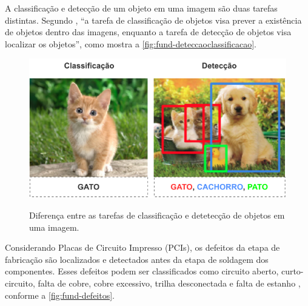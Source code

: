 A classificação e detecção de um objeto em uma imagem são duas tarefas distintas. Segundo , ``a tarefa de classificação de objetos visa prever a existência de objetos dentro das imagens, enquanto a tarefa de detecção de objetos visa localizar os objetos'', como mostra a \autoref{fig:fund-deteccaoclassificacao}.

\begin{figure}[h!] %
  \centering
  \caption{Diferença entre as tarefas de classificação e detetecção de objetos em uma imagem.}
  \includegraphics[scale=1.1]{img/img-fundamentacao-deteccaoclassificacao.pdf}
  \label{fig:fund-deteccaoclassificacao}
\end{figure}

Considerando Placas de Circuito Impresso (PCIs), os defeitos da etapa de fabricação são localizados e detectados antes da etapa de soldagem dos componentes. Esses defeitos podem ser classificados como circuito aberto, curto-circuito, falta de cobre, cobre excessivo, trilha desconectada e falta de estanho \cite{ref:Ding-et-al}, conforme a \autoref{fig:fund-defeitos}.

